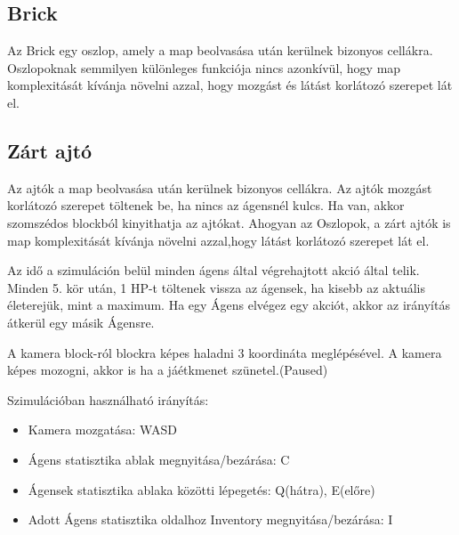 
\label{object}

\subsection{Brick}

Az Brick egy oszlop, amely a map beolvasása után kerülnek bizonyos cellákra.
Oszlopoknak semmilyen különleges funkciója nincs azonkívül, hogy map komplexitását kívánja növelni azzal,
hogy mozgást és látást korlátozó szerepet lát el.

\subsection{Zárt ajtó}

Az ajtók a map beolvasása után kerülnek bizonyos cellákra.
Az ajtók mozgást korlátozó szerepet töltenek be, ha nincs az ágensnél kulcs. Ha van, akkor szomszédos blockból kinyithatja az ajtókat.
Ahogyan az Oszlopok, a zárt ajtók is map komplexitását kívánja növelni azzal,hogy látást korlátozó szerepet lát el.


Az idő a szimuláción belül minden ágens által végrehajtott akció által telik.
Minden 5. kör után, 1 HP-t töltenek vissza az ágensek, ha kisebb az aktuális életerejük, mint a maximum.
Ha egy Ágens elvégez egy akciót, akkor az irányítás átkerül egy másik Ágensre.


A kamera block-ról blockra képes haladni 3 koordináta meglépésével.
A kamera képes mozogni, akkor is ha a jáétkmenet szünetel.(Paused)


Szimulációban használható irányítás:

\begin{itemize}
    \item Kamera mozgatása: WASD
    \item Ágens statisztika ablak megnyitása/bezárása: C
    \item Ágensek statisztika ablaka közötti lépegetés: Q(hátra), E(előre)
    \item Adott Ágens statisztika oldalhoz Inventory megnyitása/bezárása: I
\end{itemize}


